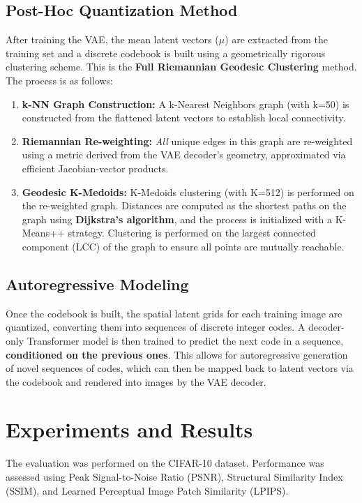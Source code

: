 \documentclass{article}
\begin{document}
\subsection{Post-Hoc Quantization Method}
After training the VAE, the mean latent vectors ($\mu$) are extracted from the training set and a discrete codebook is built using a geometrically rigorous clustering scheme. This is the \textbf{Full Riemannian Geodesic Clustering} method. The process is as follows:
\begin{enumerate}
    \item \textbf{k-NN Graph Construction:} A k-Nearest Neighbors graph (with k=50) is constructed from the flattened latent vectors to establish local connectivity.
    \item \textbf{Riemannian Re-weighting:} \textit{All} unique edges in this graph are re-weighted using a metric derived from the VAE decoder's geometry, approximated via efficient Jacobian-vector products.
    \item \textbf{Geodesic K-Medoids:} K-Medoids clustering (with K=512) is performed on the re-weighted graph. Distances are computed as the shortest paths on the graph using \textbf{Dijkstra's algorithm}, and the process is initialized with a K-Means++ strategy. Clustering is performed on the largest connected component (LCC) of the graph to ensure all points are mutually reachable.
\end{enumerate}

\subsection{Autoregressive Modeling}
Once the codebook is built, the spatial latent grids for each training image are quantized, converting them into sequences of discrete integer codes. A decoder-only Transformer model is then trained to predict the next code in a sequence, \textbf{conditioned on the previous ones}. This allows for autoregressive generation of novel sequences of codes, which can then be mapped back to latent vectors via the codebook and rendered into images by the VAE decoder.

\section{Experiments and Results}
The evaluation was performed on the CIFAR-10 dataset. Performance was assessed using Peak Signal-to-Noise Ratio (PSNR), Structural Similarity Index (SSIM), and Learned Perceptual Image Patch Similarity (LPIPS).
\end{document}

